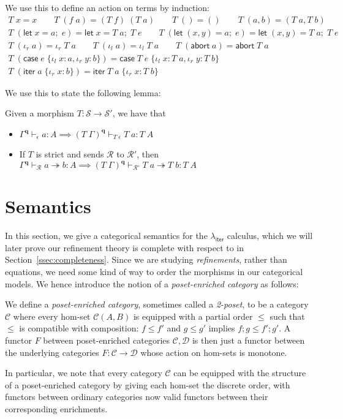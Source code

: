 \documentclass[acmsmall,screen,review]{acmart}
\newcommand{\mc}[1]{\ensuremath{\mathcal{#1}}}
\newcommand{\mb}[1]{\ensuremath{\mathbf{#1}}}
\newcommand{\ms}[1]{\ensuremath{\mathsf{#1}}}
\newcommand{\lto}{:}
\newcommand{\linl}[1]{\iota_l\;{#1}}
\newcommand{\linr}[1]{\iota_r\;{#1}}
\newcommand{\labort}[1]{\ms{abort}\;{#1}}
\newcommand{\letexpr}[3]{\ensuremath{\ms{let}\;#1 = #2;\;#3}}
\newcommand{\caseexpr}[5]{\ms{case}\;#1\;\{\linl{#2} \lto #3, \linr{#4} \lto #5\}}
\newcommand{\liter}[3]{\ms{iter}\;#1\;\{ \linr{#2} \lto #3 \}}
\newcommand{\hasty}[4]{#1 \vdash_{#2} #3: {#4}}
\newcommand{\tref}{\twoheadrightarrow}
\newcommand{\tmle}[5]{#1 \vdash_{#2} #3 \tref #4 : {#5}}
\newcommand{\subiterssa}{\(\lambda_{\ms{iter}}\)}
\begin{document}
We use this to define an action on terms by induction:
\begin{gather*}
  T\;x = x \qquad T\;(f\;a) = (T\;f)\;(T\;a) \qquad T\;() = () \qquad T\;(a, b) = (T\;a, T\;b) \\
  T\;(\letexpr{x}{a}{e}) = \letexpr{x}{T\;a}{T\;e} \qquad
  T\;(\letexpr{(x, y)}{a}{e}) = \letexpr{(x, y)}{T\;a}{T\;e} \\
  T\;(\linr{a}) = \linr{T\;a} \qquad T\;(\linl{a}) = \linl{T\;a} \qquad
  T\;(\labort{a}) = \labort{T\;a} \\
  T\;(\caseexpr{e}{x}{a}{y}{b}) = \caseexpr{T\;e}{x}{T\;a}{y}{T\;b} \\
  T\;(\liter{a}{x}{b}) = \liter{T\;a}{x}{T\;b}
\end{gather*}

We use this to state the following lemma:
\begin{lemma}
  Given a morphism $T: \mc{S} \to \mc{S}'$, we have that
  \begin{itemize}
    \item $\hasty{\Gamma^{\mb{q}}}{\epsilon}{a}{A} 
      \implies \hasty{(T\;\Gamma)^{\mb{q}}}{T\;\epsilon}{T\;a}{T\;A}$
    \item If $T$ is strict and sends $\mc{R}$ to $\mc{R}'$, then
    $\tmle{\Gamma^{\mb{q}}}{\mc{R}}{a}{b}{A}
      \implies \tmle{(T\;\Gamma)^{\mb{q}}}{\mc{R}'}{T\;a}{T\;b}{T\;A}$
  \end{itemize}
\end{lemma}

\section{Semantics}

In this section, we give a categorical semantics for the \subiterssa{} calculus, which we will later
prove our refinement theory is complete with respect to in Section~\ref{ssec:completeness}. Since we
are studying \emph{refinements}, rather than equations, we need some kind of way to order the
morphisms in our categorical models. We hence introduce the notion of a \emph{poset-enriched
category} as follows:

\begin{definition}
  We define a \emph{poset-enriched category}, sometimes called a \emph{2-poset}, to be a category
  $\mc{C}$ where every hom-set $\mc{C}(A, B)$ is equipped with a partial order $\leq$ such that
  $\leq$ is compatible with composition: $f \leq f'$ and $g \leq g'$ implies $f;g \leq f';g'$. A
  functor $F$ between poset-enriched categories $\mc{C}, \mc{D}$ is then just a functor between the
  underlying categories $F : \mc{C} \to \mc{D}$ whose action on hom-sets is monotone.

  In particular, we note that every category $\mc{C}$ can be equipped with the structure of a
  poset-enriched category by giving each hom-set the discrete order, with functors between ordinary
  categories now valid functors between their corresponding enrichments.
\end{definition}
\end{document}
